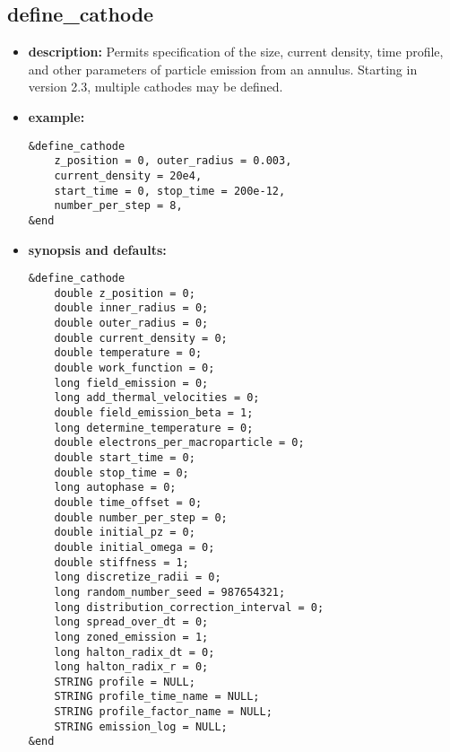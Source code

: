 %
\newpage

\subsection{define\_cathode}

\begin{itemize}

\item {\bf description:}
Permits specification of the size, current density, time profile, and
other parameters of particle emission from an annulus.  Starting in 
version 2.3, multiple cathodes may be defined.

\item {\bf example:} 
\begin{verbatim}
&define_cathode
    z_position = 0, outer_radius = 0.003,
    current_density = 20e4, 
    start_time = 0, stop_time = 200e-12,
    number_per_step = 8, 
&end
\end{verbatim}

\item {\bf synopsis and defaults:} 
\begin{verbatim}
&define_cathode
    double z_position = 0;
    double inner_radius = 0;
    double outer_radius = 0;
    double current_density = 0;
    double temperature = 0;
    double work_function = 0;
    long field_emission = 0;
    long add_thermal_velocities = 0;
    double field_emission_beta = 1;
    long determine_temperature = 0;
    double electrons_per_macroparticle = 0;
    double start_time = 0;
    double stop_time = 0;
    long autophase = 0;
    double time_offset = 0;
    double number_per_step = 0;
    double initial_pz = 0;
    double initial_omega = 0;
    double stiffness = 1;
    long discretize_radii = 0;
    long random_number_seed = 987654321;
    long distribution_correction_interval = 0;
    long spread_over_dt = 0;
    long zoned_emission = 1;
    long halton_radix_dt = 0;
    long halton_radix_r = 0;
    STRING profile = NULL;
    STRING profile_time_name = NULL;
    STRING profile_factor_name = NULL;
    STRING emission_log = NULL;
&end
\end{verbatim}


\end{itemize}
